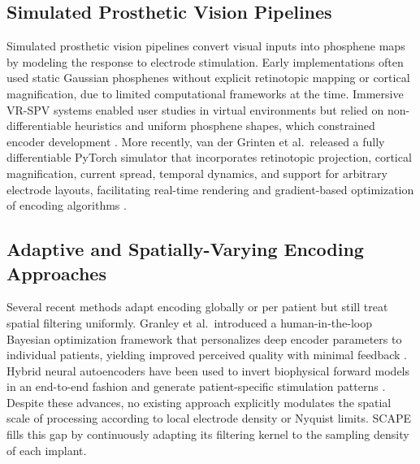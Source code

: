 \subsection{Simulated Prosthetic Vision Pipelines}
Simulated prosthetic vision pipelines convert visual inputs into phosphene maps by modeling the response to electrode stimulation. Early implementations often used static Gaussian phosphenes without explicit retinotopic mapping or cortical magnification, due to limited computational frameworks at the time. Immersive VR-SPV systems enabled user studies in virtual environments but relied on non-differentiable heuristics and uniform phosphene shapes, which constrained encoder development \cite{Kasowski2022}. More recently, van der Grinten et al.\ released a fully differentiable PyTorch simulator that incorporates retinotopic projection, cortical magnification, current spread, temporal dynamics, and support for arbitrary electrode layouts, facilitating real-time rendering and gradient-based optimization of encoding algorithms \cite{vanderGrinten2024}.

\subsection{Adaptive and Spatially-Varying Encoding Approaches}
Several recent methods adapt encoding globally or per patient but still treat spatial filtering uniformly. Granley et al.\ introduced a human-in-the-loop Bayesian optimization framework that personalizes deep encoder parameters to individual patients, yielding improved perceived quality with minimal feedback \cite{Granley2023}. Hybrid neural autoencoders have been used to invert biophysical forward models in an end-to-end fashion and generate patient-specific stimulation patterns \cite{Granley2022, deRuytervanSteveninck2020}. Despite these advances, no existing approach explicitly modulates the spatial scale of processing according to local electrode density or Nyquist limits. SCAPE fills this gap by continuously adapting its filtering kernel to the sampling density of each implant.
